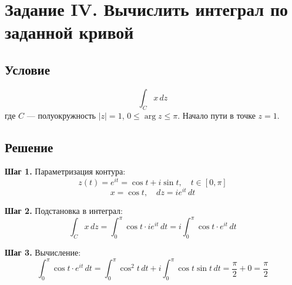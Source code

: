 \documentclass[12pt,a4paper]{article}
\begin{document}






\newpage
\section{Задание IV.  Вычислить интеграл по заданной кривой}

\subsection{Условие}
\[
\int_C x \, dz
\]
где $C$ --- полуокружность $|z| = 1$, $0 \leq \arg z \leq \pi$.  Начало пути в точке $z = 1$.

\subsection{Решение}

\textbf{Шаг 1.} Параметризация контура:
\[
z(t) = e^{it} = \cos t + i\sin t, \quad t \in [0, \pi]
\]
\[
x = \cos t, \quad dz = ie^{it} \, dt
\]

\textbf{Шаг 2.} Подстановка в интеграл:
\[
\int_C x \, dz = \int_0^{\pi} \cos t \cdot ie^{it} \, dt = i \int_0^{\pi} \cos t \cdot e^{it} \, dt
\]

\textbf{Шаг 3. } Вычисление:
\[
\int_0^{\pi} \cos t \cdot e^{it} \, dt = \int_0^{\pi} \cos^2 t \, dt + i \int_0^{\pi} \cos t \sin t \, dt = \frac{\pi}{2} + 0 = \frac{\pi}{2}
\]
\end{document}

